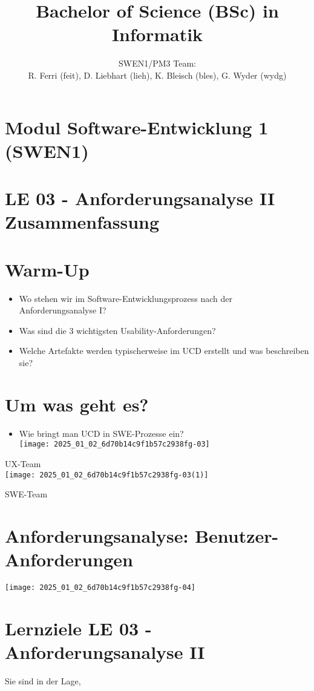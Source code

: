 \documentclass[10pt]{article}
\title{Bachelor of Science (BSc) in Informatik }
\author{SWEN1/PM3 Team:\\
R. Ferri (feit), D. Liebhart (lieh), K. Bleisch (bles), G. Wyder (wydg)}
\date{}
\begin{document}
\maketitle
\section*{Modul Software-Entwicklung 1 (SWEN1) }
\section*{LE 03 - Anforderungsanalyse II Zusammenfassung}


\section*{Warm-Up}
\begin{itemize}
  \item Wo stehen wir im Software-Entwicklungsprozess nach der Anforderungsanalyse I?
  \item Was sind die 3 wichtigsten Usability-Anforderungen?
  \item Welche Artefakte werden typischerweise im UCD erstellt und was beschreiben sie?
\end{itemize}

\section*{Um was geht es?}
\begin{itemize}
  \item Wie bringt man UCD in SWE-Prozesse ein?\\
\texttt{[image: 2025\_01\_02\_6d70b14c9f1b57c2938fg-03]}
\end{itemize}

UX-Team\\
\texttt{[image: 2025\_01\_02\_6d70b14c9f1b57c2938fg-03(1)]}

SWE-Team

\section*{Anforderungsanalyse: Benutzer-Anforderungen}
\begin{center}
\texttt{[image: 2025\_01\_02\_6d70b14c9f1b57c2938fg-04]}
\end{center}

\section*{Lernziele LE 03 - Anforderungsanalyse II}
Sie sind in der Lage,
\end{document}
